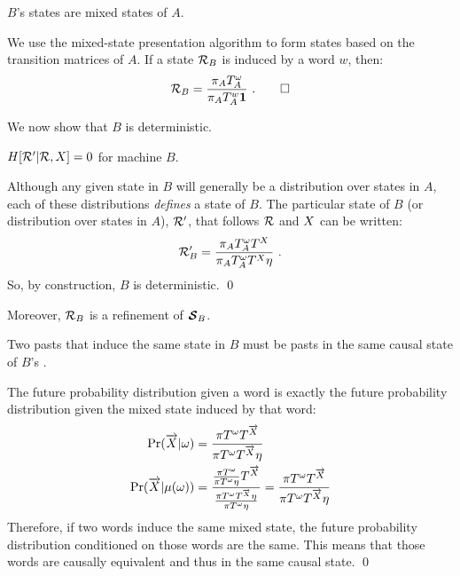 \begin{Prop}
$B$'s states are mixed states of $A$.
\end{Prop}

\begin{ProProp}
We use the mixed-state presentation algorithm to form states based on the
transition matrices of $A$. If a state $\mathcal{R}_B$ is induced by a
word $w$, then:
\begin{align*}
\mathcal{R}_B = \frac{\pi_A T_A^{\omega}}{\pi_A T_A^{w} \mathbf{1}} ~.
\qed
\end{align*}
\end{ProProp}

We now show that $B$ is deterministic.

\begin{Prop}
$H[\mathcal{R}' | \mathcal{R}, {X}] = 0$ for machine $B$.
\end{Prop}

\begin{ProProp}
Although any given state in $B$ will generally be a distribution over states
in $A$, each of these distributions \emph{defines} a state of $B$. The
particular state of $B$ (or distribution over states in $A$),
$\mathcal{R}'$, that follows $\mathcal{R}$ and ${X}$ can be
written:
\begin{align*}
\mathcal{R}'_B
  = \frac{\pi_A T_A^{\omega} T^{{X}}}
    {\pi_A T_A^{\omega} T^{{X}} \eta} ~.
\end{align*}
So, by construction, $B$ is deterministic.
\qed
\end{ProProp}

Moreover, $\mathcal{R}_B$ is a refinement of $\boldsymbol{\mathcal{S}}_B$.

\begin{Prop}
Two pasts that induce the same state in $B$ must be pasts in the same
causal state of $B$'s \eM.
\end{Prop}

\begin{ProProp}
The future probability distribution given a word is exactly the future
probability distribution given the mixed state induced by that word:
\begin{align*}
\Pr(\overrightarrow{{X}} | \omega)
  & = \frac{\pi T^{\omega} T^{\overrightarrow{{X}}}}
  	{\pi T^{\omega} T^{\overrightarrow{{X}}} \eta}\\
\Pr(\overrightarrow{{X}} | \mu(\omega))
  & = \frac{\frac{\pi T^{\omega}}{\pi T^{\omega} \eta} T^{\overrightarrow{{X}}}}
  	{\frac{\pi T^{\omega} T^{\overrightarrow{{X}}} \eta}{\pi T^{\omega} \eta}}
  = \frac{\pi T^{\omega} T^{\overrightarrow{{X}}}}{\pi T^{\omega} T^{\overrightarrow{{X}}} \eta}
\end{align*}
Therefore, if two words induce the same mixed state, the future probability
distribution conditioned on those words are the same. This means that those
words are causally equivalent and thus in the same causal state.
\qed
\end{ProProp}

